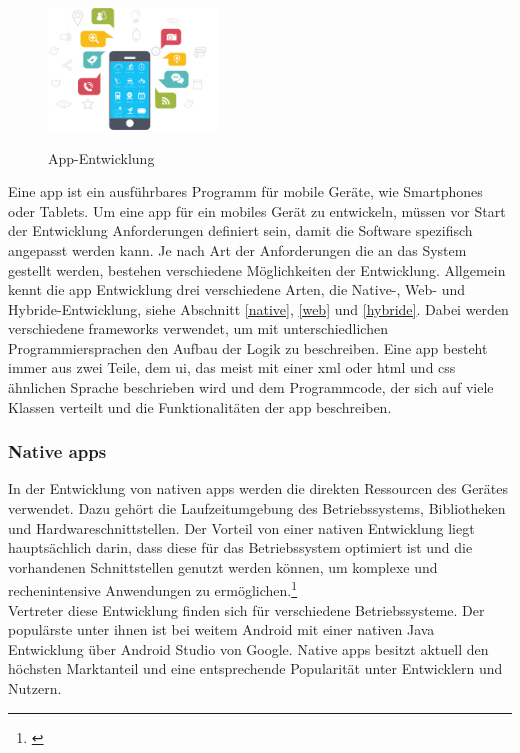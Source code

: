 \begin{figure}
	\begin{center}
		\includegraphics[width=0.4\textwidth]{images/technische_grundlagen/App-Development.jpg}
	\end{center}
	\caption{App-Entwicklung}	
	\cite{Nethority.Web&App}
	\label{fig:appentwicklung}
\end{figure}

Eine \gls{app} ist ein ausführbares Programm für mobile Geräte, wie Smartphones oder Tablets. Um eine \gls{app} für ein mobiles Gerät zu entwickeln, müssen vor Start der Entwicklung Anforderungen definiert sein, damit die Software spezifisch angepasst werden kann. Je nach Art der Anforderungen die an das System gestellt werden, bestehen verschiedene Möglichkeiten der Entwicklung. Allgemein kennt die \gls{app} Entwicklung drei verschiedene Arten, die Native-, Web- und Hybride-Entwicklung, siehe Abschnitt \eqref{native}, \eqref{web} und \eqref{hybride}. Dabei werden verschiedene \glspl{framework} verwendet, um mit unterschiedlichen Programmiersprachen den Aufbau der Logik zu beschreiben. Eine \gls{app} besteht immer aus zwei Teile, dem \gls{ui}, das meist mit einer \gls{xml} oder \gls{html} und \gls{css} ähnlichen Sprache beschrieben wird und dem Programmcode, der sich auf viele Klassen verteilt und die Funktionalitäten der \gls{app} beschreiben.

\subsubsection{Native \glspl{app}}\label{native}

In der Entwicklung von nativen \glspl{app} werden die direkten Ressourcen des Gerätes verwendet. Dazu gehört die Laufzeitumgebung des Betriebssystems, Bibliotheken und Hardwareschnittstellen. Der Vorteil von einer nativen Entwicklung liegt hauptsächlich darin, dass diese für das Betriebssystem optimiert ist und die vorhandenen Schnittstellen genutzt werden können, um komplexe und rechenintensive Anwendungen zu ermöglichen.\footnote{\citep[vgl.][Unterschiede und Vergleich native Apps vs. Web Apps]{DanielWurstl.Unterschiedeund}\label{note36}}\\
Vertreter diese Entwicklung finden sich für verschiedene Betriebssysteme. Der populärste unter ihnen ist bei weitem Android mit einer nativen Java Entwicklung über Android Studio von Google. Native \glspl{app} besitzt aktuell den höchsten Marktanteil und eine entsprechende Popularität unter Entwicklern und Nutzern.

